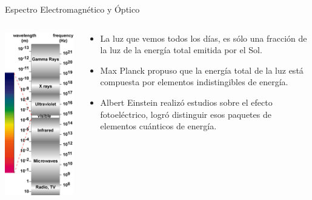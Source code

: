 \documentclass[aspectratio=169]{beamer}
\begin{document}
\begin{frame}{Espectro Electromagnético y Óptico}
\begin{columns}[c, onlytextwidth]
        \begin{column}{0.4\textwidth}
            \centering
            \includegraphics[width = 0.48\linewidth]{fig/Optica/Espectro.png}\\
        \end{column}
        \begin{column}{0.6\textwidth}
            \begin{itemize}
                \item La luz que vemos todos los días, es sólo una fracción de la luz de la energía total emitida por el Sol. 
                \item  Max Planck propuso que la energía total de la luz está compuesta por elementos indistingibles de energía.
                \item Albert Einstein realizó estudios sobre el efecto fotoeléctrico, logró distinguir esos paquetes de elementos cuánticos de energía.
            \end{itemize}
        \end{column}
    \end{columns}
\end{frame}
\end{document}
